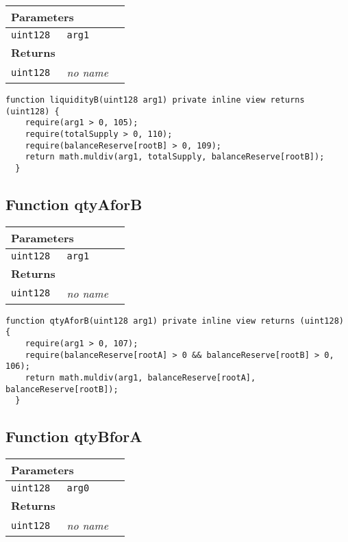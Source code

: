 \ifsoltables
\noindent\begin{tabular}{|l|l|p{5cm}|}\hline
\multicolumn{3}{|l|}{\bf Parameters}\\\hline
\tt uint128 & \tt arg1 &\\\hline
\multicolumn{3}{|l|}{\bf Returns}\\\hline
\tt uint128 & {\em no name} &\\\hline
\end{tabular}
\fi

\vspace{2cm}

\begin{lstlisting}[firstnumber=199]
  function liquidityB(uint128 arg1) private inline view returns (uint128) {
    require(arg1 > 0, 105);
    require(totalSupply > 0, 110);
    require(balanceReserve[rootB] > 0, 109);
    return math.muldiv(arg1, totalSupply, balanceReserve[rootB]);
  }
\end{lstlisting}

\subsection{Function qtyAforB}


\ifsoltables
\noindent\begin{tabular}{|l|l|p{5cm}|}\hline
\multicolumn{3}{|l|}{\bf Parameters}\\\hline
\tt uint128 & \tt arg1 &\\\hline
\multicolumn{3}{|l|}{\bf Returns}\\\hline
\tt uint128 & {\em no name} &\\\hline
\end{tabular}
\fi

\vspace{2cm}

\begin{lstlisting}[firstnumber=184]
  function qtyAforB(uint128 arg1) private inline view returns (uint128) {
    require(arg1 > 0, 107);
    require(balanceReserve[rootA] > 0 && balanceReserve[rootB] > 0, 106);
    return math.muldiv(arg1, balanceReserve[rootA], balanceReserve[rootB]);
  }
\end{lstlisting}

\subsection{Function qtyBforA}


\ifsoltables
\noindent\begin{tabular}{|l|l|p{5cm}|}\hline
\multicolumn{3}{|l|}{\bf Parameters}\\\hline
\tt uint128 & \tt arg0 &\\\hline
\multicolumn{3}{|l|}{\bf Returns}\\\hline
\tt uint128 & {\em no name} &\\\hline
\end{tabular}
\fi

